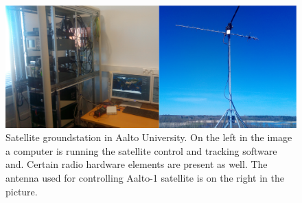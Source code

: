 \documentclass[english,12pt,a4paper,pdftex,elec,utf8]{aaltothesis}
\begin{document}
\begin{figure}[!h]
\centering
\includegraphics[scale=0.2]{groundstation}
\caption{Satellite groundstation in Aalto University. On the left in the image a computer is running the satellite control and tracking software and. Certain radio hardware elements are present as well. The antenna used for controlling Aalto-1 satellite is on the right in the picture.}
\label{aaltogs}
\end{figure}  
    
\end{document}
